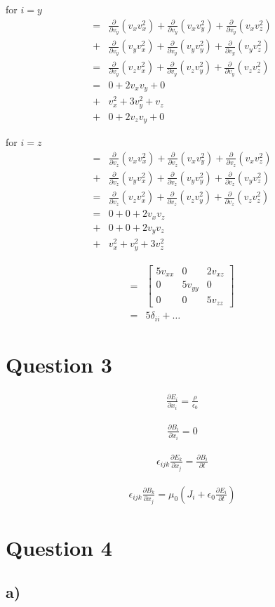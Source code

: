\documentclass[paper=a4, fontsize=12pt]{scrartcl}
\begin{document}
for $i = y $
\begin{align*}
=&
 \frac{\partial}{\partial v_y}(v_x v_x^2)
+\frac{\partial}{\partial v_y}(v_x v_y^2)
+\frac{\partial}{\partial v_y}(v_x v_z^2)\\
+& 
 \frac{\partial}{\partial v_y}(v_y v_x^2)
+\frac{\partial}{\partial v_y}(v_y v_y^2)
+\frac{\partial}{\partial v_y}(v_y v_z^2)\\
=&
 \frac{\partial}{\partial v_y}(v_z v_x^2)
+\frac{\partial}{\partial v_y}(v_z v_y^2)
+\frac{\partial}{\partial v_y}(v_z v_z^2)\\
=&
     0 + 2v_xv_y + 0\\
+&   v_x^2 + 3v_y^2 + v_z \\
+&   0 + 2v_zv_y + 0 
\end{align*}	

for $i = z $
\begin{align*}
=&
 \frac{\partial}{\partial v_z}(v_x v_x^2)
+\frac{\partial}{\partial v_z}(v_x v_y^2)
+\frac{\partial}{\partial v_z}(v_x v_z^2)\\
+& 
 \frac{\partial}{\partial v_z}(v_y v_x^2)
+\frac{\partial}{\partial v_z}(v_y v_y^2)
+\frac{\partial}{\partial v_z}(v_y v_z^2)\\
=&
 \frac{\partial}{\partial v_z}(v_z v_x^2)
+\frac{\partial}{\partial v_z}(v_z v_y^2)
+\frac{\partial}{\partial v_z}(v_z v_z^2)\\
=&
0 + 0 + 2v_xv_z\\
+&   0 + 0 + 2v_yv_z \\
+&   v_x^2 + v_y^2 + 3v_z^2 
\end{align*}	

\begin{align*}
=&\begin{bmatrix}
 5v_{xx} & 0&2v_{xz} \\
 0 & 5 v_{yy} & 0 \\
 0 & 0 & 5v_{zz}
\end{bmatrix}\\
=& 5 \delta_{ii} + \dots
\end{align*}

\section*{Question 3}
\begin{align*}
\frac{\partial E_i}{\partial x_i} = \frac{\rho}{\epsilon_0}
\end{align*}

\begin{align*}
\frac{\partial B_i}{\partial x_i} = 0
\end{align*}

\begin{align*}
\epsilon_{ijk}\frac{\partial E_k}{\partial x_j} = \frac{\partial B_i}{\partial t}
\end{align*}

\begin{align*}
\epsilon_{ijk}\frac{\partial B_k}{\partial x_j} = \mu_0(J_i + \epsilon_0 \frac{\partial E_i}{\partial t})
\end{align*}
	
\section*{Question 4}
\subsection*{a)}
	
\end{document}
